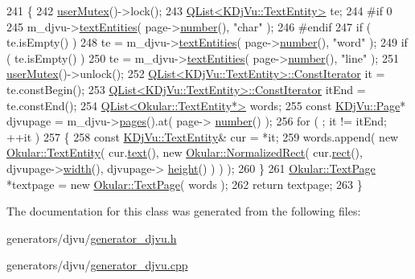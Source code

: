 \begin{DoxyCode}
241 \{
242     \hyperlink{classOkular_1_1Generator_a83d702cccbce2288c3258d97f1f15e19}{userMutex}()->lock();
243     \hyperlink{classQList}{QList<KDjVu::TextEntity>} te;
244 \textcolor{preprocessor}{#if 0}
245     m\_djvu->\hyperlink{classKDjVu_a658d09462a1b727a001c6f7f183a3f7e}{textEntities}( page->\hyperlink{classOkular_1_1Page_a6eee5f157a130b47d81ddd63e501664b}{number}(), \textcolor{stringliteral}{"char"} );
246 \textcolor{preprocessor}{#endif}
247     \textcolor{keywordflow}{if} ( te.isEmpty() )
248         te = m\_djvu->\hyperlink{classKDjVu_a658d09462a1b727a001c6f7f183a3f7e}{textEntities}( page->\hyperlink{classOkular_1_1Page_a6eee5f157a130b47d81ddd63e501664b}{number}(), \textcolor{stringliteral}{"word"} );
249     \textcolor{keywordflow}{if} ( te.isEmpty() )
250         te = m\_djvu->\hyperlink{classKDjVu_a658d09462a1b727a001c6f7f183a3f7e}{textEntities}( page->\hyperlink{classOkular_1_1Page_a6eee5f157a130b47d81ddd63e501664b}{number}(), \textcolor{stringliteral}{"line"} );
251     \hyperlink{classOkular_1_1Generator_a83d702cccbce2288c3258d97f1f15e19}{userMutex}()->unlock();
252     \hyperlink{classQList}{QList<KDjVu::TextEntity>::ConstIterator} it = te.constBegin();
253     \hyperlink{classQList}{QList<KDjVu::TextEntity>::ConstIterator} itEnd = te.constEnd();
254     \hyperlink{classQList}{QList<Okular::TextEntity*>} words;
255     \textcolor{keyword}{const} \hyperlink{classKDjVu_1_1Page}{KDjVu::Page}* djvupage = m\_djvu->\hyperlink{classKDjVu_aea351abdd42f5494382d2d3d20c1a94e}{pages}().at( page->
      \hyperlink{classOkular_1_1Page_a6eee5f157a130b47d81ddd63e501664b}{number}() );
256     \textcolor{keywordflow}{for} ( ; it != itEnd; ++it )
257     \{
258         \textcolor{keyword}{const} \hyperlink{classKDjVu_1_1TextEntity}{KDjVu::TextEntity}& cur = *it;
259         words.append( \textcolor{keyword}{new} \hyperlink{classOkular_1_1TextEntity}{Okular::TextEntity}( cur.\hyperlink{classKDjVu_1_1TextEntity_a3b16cdc8e0b07a6b4f9cf3527ce765ff}{text}(), \textcolor{keyword}{new} 
      \hyperlink{classOkular_1_1NormalizedRect}{Okular::NormalizedRect}( cur.\hyperlink{classKDjVu_1_1TextEntity_a758c398cb673ea39b822fc1b0eb6dc47}{rect}(), djvupage->\hyperlink{classKDjVu_1_1Page_a166b65d10707265dbd7b14a910ad2212}{width}(), djvupage->
      \hyperlink{classKDjVu_1_1Page_a062855315cad5728f12eb1f95e453450}{height}() ) ) );
260     \}
261     \hyperlink{classOkular_1_1TextPage}{Okular::TextPage} *textpage = \textcolor{keyword}{new} \hyperlink{classOkular_1_1TextPage}{Okular::TextPage}( words );
262     \textcolor{keywordflow}{return} textpage;
263 \}
\end{DoxyCode}


The documentation for this class was generated from the following files\+:\begin{DoxyCompactItemize}
\item 
generators/djvu/\hyperlink{generator__djvu_8h}{generator\+\_\+djvu.\+h}\item 
generators/djvu/\hyperlink{generator__djvu_8cpp}{generator\+\_\+djvu.\+cpp}\end{DoxyCompactItemize}

